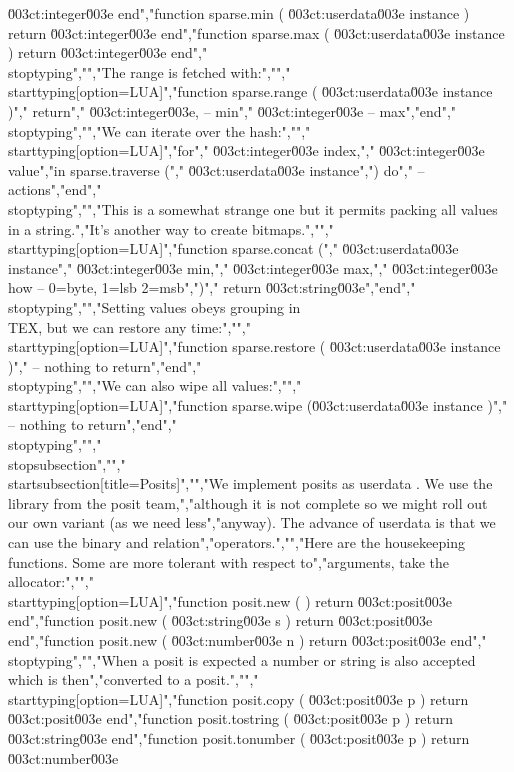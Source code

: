\u003ct:integer\u003e end","function sparse.min ( \u003ct:userdata\u003e instance ) return \u003ct:integer\u003e end","function sparse.max ( \u003ct:userdata\u003e instance ) return \u003ct:integer\u003e end","\\stoptyping","","The range is fetched with:","","\\starttyping[option=LUA]","function sparse.range ( \u003ct:userdata\u003e instance )","    return","        \u003ct:integer\u003e, -- min","        \u003ct:integer\u003e  -- max","end","\\stoptyping","","We can iterate over the hash:","","\\starttyping[option=LUA]","for","    \u003ct:integer\u003e index,","    \u003ct:integer\u003e value","in sparse.traverse (","    \u003ct:userdata\u003e instance",") do","    -- actions","end","\\stoptyping","","This is a somewhat strange one but it permits packing all values in a string.","It's another way to create bitmaps.","","\\starttyping[option=LUA]","function sparse.concat (","    \u003ct:userdata\u003e instance","    \u003ct:integer\u003e  min,","    \u003ct:integer\u003e  max,","    \u003ct:integer\u003e  how  -- 0=byte, 1=lsb 2=msb",")","    return \u003ct:string\u003e","end","\\stoptyping","","Setting values obeys grouping in \\TEX, but we can restore any time:","","\\starttyping[option=LUA]","function sparse.restore ( \u003ct:userdata\u003e instance )","    -- nothing to return","end","\\stoptyping","","We can also wipe all values:","","\\starttyping[option=LUA]","function sparse.wipe (\u003ct:userdata\u003e instance )","    -- nothing to return","end","\\stoptyping","","\\stopsubsection","","\\startsubsection[title=Posits]","","We implement posits as userdata . We use the library from the posit team,","although it is not complete so we might roll out our own variant (as we need less","anyway). The advance of userdata is that we can use the binary and relation","operators.","","Here are the housekeeping functions. Some are more tolerant with respect to","arguments, take the allocator:","","\\starttyping[option=LUA]","function posit.new (              ) return \u003ct:posit\u003e end","function posit.new ( \u003ct:string\u003e s ) return \u003ct:posit\u003e end","function posit.new ( \u003ct:number\u003e n ) return \u003ct:posit\u003e end","\\stoptyping","","When a posit is expected a number or string is also accepted which is then","converted to a posit.","","\\starttyping[option=LUA]","function posit.copy      ( \u003ct:posit\u003e  p ) return \u003ct:posit\u003e   end","function posit.tostring  ( \u003ct:posit\u003e  p ) return \u003ct:string\u003e  end","function posit.tonumber  ( \u003ct:posit\u003e  p ) return \u003ct:number\u003e  